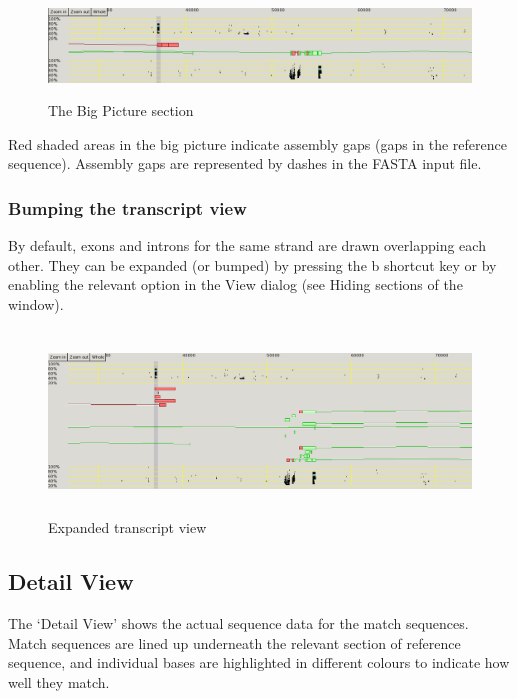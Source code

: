 \documentclass[letterpaper]{article}
\begin{document}
\bigskip

\begin{figure}
\centering
\color[rgb]{0.30980393,0.5058824,0.7411765}
\includegraphics[width=15.24cm,height=2.686cm]{img_view_big_picture.png}
\caption{The Big Picture section}
\end{figure}

{Red shaded areas in the big picture indicate assembly gaps (gaps in the
reference sequence). Assembly gaps are represented by dashes in the
FASTA input file.}

\bigskip

{\color[rgb]{0.30980393,0.5058824,0.7411765}\subsubsection[Bumping the transcript view]{Bumping the transcript view}}
{By default, exons and introns for the same strand are drawn overlapping
each other. They can be expanded (or
{\textquotesingle}bumped{\textquotesingle}) by pressing the
{\textquotesingle}b{\textquotesingle} shortcut key or by enabling the
relevant option in the View dialog (see Hiding sections of the
window).}

\bigskip

\begin{figure}
\centering
\color[rgb]{0.30980393,0.5058824,0.7411765}
\includegraphics[width=15.24cm,height=4.898cm]{img_view_transcripts.png}
\caption{Expanded transcript view}
\end{figure}

{\color[rgb]{0.30980393,0.5058824,0.7411765}\subsection[Detail View]{Detail View}}
{The {\textquoteleft}Detail View{\textquoteright} shows the actual
sequence data for the match sequences. Match sequences are lined up
underneath the relevant section of reference sequence, and individual
bases are highlighted in different colours to indicate how well they
match.}
\end{document}
